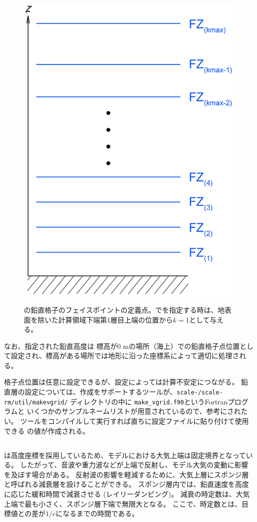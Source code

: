 \begin{figure}[tb]
\begin{center}
  \includegraphics[width=0.4\hsize]{./figure/verticalface.eps}\\
  \caption{\scalerm の鉛直格子のフェイスポイントの定義点。でを指定する時は、地表面を除いた計算領域下端第1層目上端の位置から$k=1$として与える。}
  \label{fig:scale_grid}
\end{center}
\end{figure}

なお、指定された鉛直高度は
標高が0 mの場所（海上）での鉛直格子点位置として設定され、標高がある場所では地形に沿った座標系によって適切に処理される。


格子点位置は任意に設定できるが、設定によっては計算不安定につながる。
鉛直層の設定については、作成をサポートするツールが、\texttt{scale-\version/scale-rm/util/makevgrid/}
ディレクトリの中に \verb|make_vgrid.f90|というFortranプログラムと
いくつかのサンプルネームリストが用意されているので、参考にされたい。
ツールをコンパイルして実行すれば直ちに設定ファイルに貼り付けて使用できる
の値が作成される。

\subsection{\SubsecRayleighDampingSetting} \label{subsec:raydamp}

\scalerm は高度座標を採用しているため、モデルにおける大気上端は固定境界となっている。
したがって、音波や重力波などが上端で反射し、モデル大気の変動に影響を及ぼす場合がある。
反射波の影響を軽減するために、大気上層にスポンジ層と呼ばれる減衰層を設けることができる。
スポンジ層内では、鉛直速度を高度に応じた緩和時間で減衰させる (レイリーダンピング)。
減衰の時定数は、大気上端で最も小さく、スポンジ層下端で無限大となる。
ここで、時定数とは、目標値との差が$1/e$になるまでの時間である。

